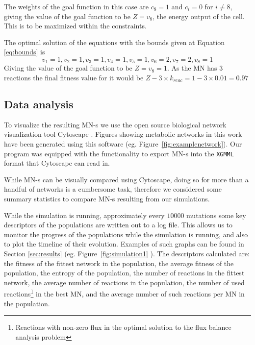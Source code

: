 \documentclass[a4paper,12pt]{article}
\begin{document}
	The weights of the goal function in this case are $c_8=1$ and $c_i=0$ for $i\neq 8$, giving the value of the goal function to be $Z=v_8$, the energy output of the cell. This is to be maximized within the constraints.

	The optimal solution of the equations with the bounds given at Equation \ref{eq:bounds} is 
	\begin{equation}\label{eq:solution}
		v_1=1 , v_2=1, v_3=1, v_4=1, v_5=1, v_6=2, v_7=2, v_8=1
	\end{equation}
	Giving the value of the goal function to be $Z=v_8=1$. As the MN has $3$ reactions the final fitness value for it would be $Z-3\times k_{reac}=1-3\times 0.01=0.97$
\subsection{Data analysis}
\label{sub:visualization}

To visualize the resulting MN-s we use the open source biological network visualization tool Cytoscape \cite{cytoscape}. Figures showing metabolic networks in this work have been generated using this software (eg.  Figure~\ref{fig:examplenetwork}). Our program was equipped with the functionality to export MN-s into the \texttt{XGMML} format that Cytoscape can read in. 

While MN-s can be visually compared using Cytoscape, doing so for more than a handful of networks is a cumbersome task, therefore we considered some summary statistics to compare MN-s resulting from our simulations.

While the simulation is running, approximately every $10000$ mutations some key descriptors of the populations are written out to a log file. This allows us to monitor the progress of the populations while the simulation is running, and also to plot the timeline of their evolution. Examples of such graphs can be found in Section \ref{sec:results} (eg. Figure~\ref{fig:simulation1} ). The descriptors calculated are: the fitness of the fittest network in the population, the average fitness of the population, the entropy of the population, the number of reactions in the fittest network, the average number of reactions in the population, the number of used reactions\footnote{Reactions with non-zero flux in the optimal solution to the flux balance analysis problem} in the best MN, and the average number of such reactions per MN in the population. 
\end{document}
